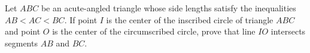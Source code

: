 Let $ABC$ be an acute-angled triangle whose side lengths satisfy the inequalities $AB < AC < BC$. If point $I$ is the center of the inscribed circle of triangle $ABC$ and point $O$ is the center of the circumscribed circle, prove that line $IO$ intersects segments $AB$ and $BC$.